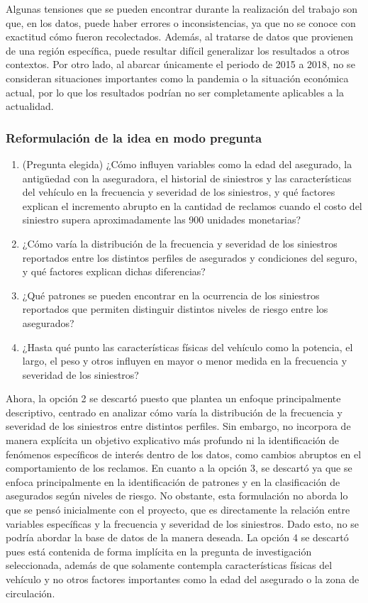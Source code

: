 \documentclass[
  spanish,
  11pt,
  letterpaper,
]{article}
\begin{document}
Algunas tensiones que se pueden encontrar durante la realización del
trabajo son que, en los datos, puede haber errores o inconsistencias, ya
que no se conoce con exactitud cómo fueron recolectados. Además, al
tratarse de datos que provienen de una región específica, puede resultar
difícil generalizar los resultados a otros contextos. Por otro lado, al
abarcar únicamente el periodo de 2015 a 2018, no se consideran
situaciones importantes como la pandemia o la situación económica
actual, por lo que los resultados podrían no ser completamente
aplicables a la actualidad.

\subsubsection{Reformulación de la idea en modo
pregunta}\label{reformulaciuxf3n-de-la-idea-en-modo-pregunta}

\begin{enumerate}
\def\labelenumi{\arabic{enumi}.}
\item
  (Pregunta elegida) ¿Cómo influyen variables como la edad del
  asegurado, la antigüedad con la aseguradora, el historial de
  siniestros y las características del vehículo en la frecuencia y
  severidad de los siniestros, y qué factores explican el incremento
  abrupto en la cantidad de reclamos cuando el costo del siniestro
  supera aproximadamente las 900 unidades monetarias?
\item
  ¿Cómo varía la distribución de la frecuencia y severidad de los
  siniestros reportados entre los distintos perfiles de asegurados y
  condiciones del seguro, y qué factores explican dichas diferencias?
\item
  ¿Qué patrones se pueden encontrar en la ocurrencia de los siniestros
  reportados que permiten distinguir distintos niveles de riesgo entre
  los asegurados?
\item
  ¿Hasta qué punto las características físicas del vehículo como la
  potencia, el largo, el peso y otros influyen en mayor o menor medida
  en la frecuencia y severidad de los siniestros?
\end{enumerate}

Ahora, la opción 2 se descartó puesto que plantea un enfoque
principalmente descriptivo, centrado en analizar cómo varía la
distribución de la frecuencia y severidad de los siniestros entre
distintos perfiles. Sin embargo, no incorpora de manera explícita un
objetivo explicativo más profundo ni la identificación de fenómenos
específicos de interés dentro de los datos, como cambios abruptos en el
comportamiento de los reclamos. En cuanto a la opción 3, se descartó ya
que se enfoca principalmente en la identificación de patrones y en la
clasificación de asegurados según niveles de riesgo. No obstante, esta
formulación no aborda lo que se pensó inicialmente con el proyecto, que
es directamente la relación entre variables específicas y la frecuencia
y severidad de los siniestros. Dado esto, no se podría abordar la base
de datos de la manera deseada. La opción 4 se descartó pues está
contenida de forma implícita en la pregunta de investigación
seleccionada, además de que solamente contempla características físicas
del vehículo y no otros factores importantes como la edad del asegurado
o la zona de circulación.
\end{document}
